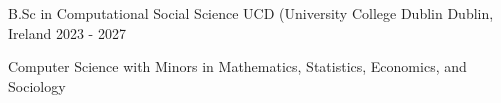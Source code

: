 

\begin{cventries}

  \cventry
    {B.Sc in Computational Social Science} %
    {UCD (University College Dublin} %
    {Dublin, Ireland} %
    {2023 - 2027} %
    {
      \begin{cvitems} %
        \item {Computer Science with Minors in Mathematics, Statistics, Economics, and Sociology}
      \end{cvitems}
    }

\end{cventries}
